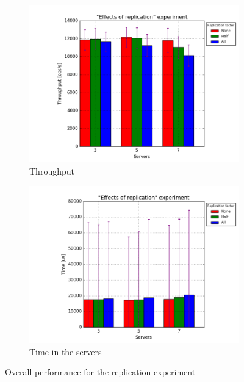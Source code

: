 \documentclass[11pt]{article}
\begin{document}
\begin{figure}
\centering
\begin{subfigure}{.5\textwidth}
	\centering
	\includegraphics[width=\linewidth]{plots/replication}
	\caption{Throughput}
	\label{fig:replication-throughput}
\end{subfigure}%
\begin{subfigure}{.5\textwidth}
	\centering
	\includegraphics[width=\linewidth]{plots/replication-response_time}
	\caption{Time in the servers}
	\label{fig:replication-reponse-time}
\end{subfigure}
\caption{Overall performance for the replication experiment}
\label{fig:replication-overall}
\end{figure}
\end{document}

